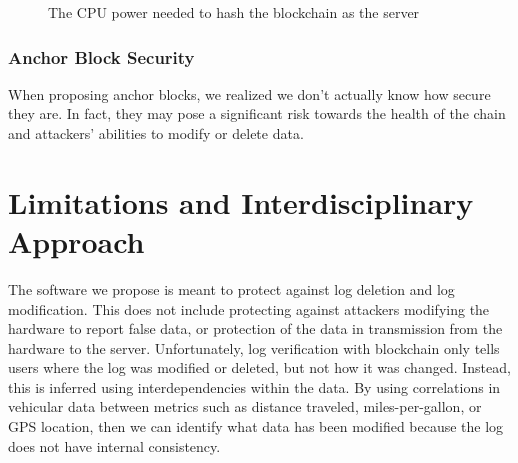  \begin{figure}[hbt!]
    \centering

    \caption{The CPU power needed to hash the blockchain as the server}
    \label{fig:passiveReqs}
\end{figure}
    
    
    
    \subsubsection{Anchor Block Security}
    When proposing anchor blocks, we realized we don't actually know how secure they are. In fact, they may pose a significant risk towards the health of the chain and attackers' abilities to modify or delete data. 
        
        
        
        
        \section{Limitations and Interdisciplinary Approach}     
         The software we propose is meant to protect against log deletion and log modification. This does not include protecting against attackers modifying the hardware to report false data, or protection of the data in transmission from the hardware to the server. Unfortunately, log verification with blockchain only tells users where the log was modified or deleted, but not how it was changed. Instead, this is inferred using interdependencies within the data. By using correlations in vehicular data between metrics such as distance traveled, miles-per-gallon, or GPS location, then we can identify what data has been modified because the log does not have internal consistency.
         
         
         
         
         
         